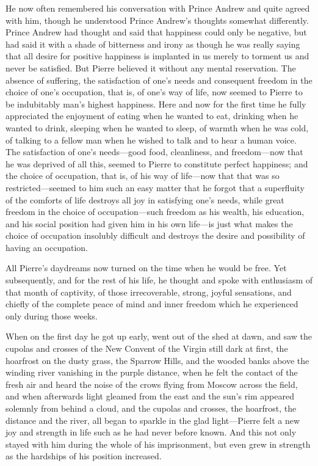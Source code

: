 He now often remembered his conversation with Prince Andrew and
quite agreed with him, though he understood Prince Andrew's
thoughts somewhat differently. Prince Andrew had thought and said
that happiness could only be negative, but had said it with a
shade of bitterness and irony as though he was really saying that
all desire for positive happiness is implanted in us merely to
torment us and never be satisfied. But Pierre believed it without
any mental reservation. The absence of suffering, the
satisfaction of one's needs and consequent freedom in the choice
of one's occupation, that is, of one's way of life, now seemed to
Pierre to be indubitably man's highest happiness. Here and now
for the first time he fully appreciated the enjoyment of eating
when he wanted to eat, drinking when he wanted to drink, sleeping
when he wanted to sleep, of warmth when he was cold, of talking
to a fellow man when he wished to talk and to hear a human
voice. The satisfaction of one's needs---good food, cleanliness,
and freedom---now that he was deprived of all this, seemed to
Pierre to constitute perfect happiness; and the choice of
occupation, that is, of his way of life---now that that was so
restricted---seemed to him such an easy matter that he forgot
that a superfluity of the comforts of life destroys all joy in
satisfying one's needs, while great freedom in the choice of
occupation---such freedom as his wealth, his education, and his
social position had given him in his own life---is just what
makes the choice of occupation insolubly difficult and destroys
the desire and possibility of having an occupation.

All Pierre's daydreams now turned on the time when he would be
free. Yet subsequently, and for the rest of his life, he thought
and spoke with enthusiasm of that month of captivity, of those
irrecoverable, strong, joyful sensations, and chiefly of the
complete peace of mind and inner freedom which he experienced
only during those weeks.

When on the first day he got up early, went out of the shed at
dawn, and saw the cupolas and crosses of the New Convent of the
Virgin still dark at first, the hoarfrost on the dusty grass, the
Sparrow Hills, and the wooded banks above the winding river
vanishing in the purple distance, when he felt the contact of the
fresh air and heard the noise of the crows flying from Moscow
across the field, and when afterwards light gleamed from the east
and the sun's rim appeared solemnly from behind a cloud, and the
cupolas and crosses, the hoarfrost, the distance and the river,
all began to sparkle in the glad light---Pierre felt a new joy
and strength in life such as he had never before known. And this
not only stayed with him during the whole of his imprisonment,
but even grew in strength as the hardships of his position
increased.

